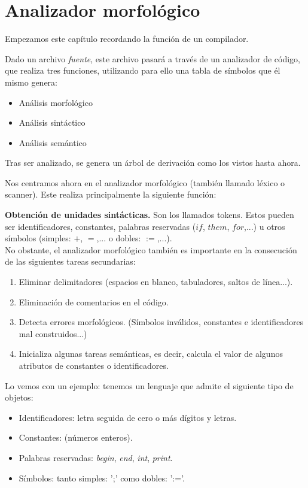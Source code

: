 \documentclass{apuntes}
\begin{document}
\chapter{Analizador morfológico}
Empezamos este capítulo recordando la función de un compilador.

Dado un archivo \textit{fuente}, este archivo pasará a través de un analizador de código, que realiza tres funciones, utilizando para ello una tabla de símbolos que él mismo genera:
\begin{itemize}
\item Análisis morfológico
\item Análisis sintáctico
\item Análisis semántico
\end{itemize}
Tras ser analizado, se genera un árbol de derivación como los vistos hasta ahora.

Nos centramos ahora en el analizador morfológico (también llamado léxico o scanner). Este realiza principalmente la siguiente función:

\textbf{Obtención de unidades sintácticas.} Son los llamados tokens. Estos pueden ser identificadores, constantes, palabras reservadas ($if$, $them$, $for$,...) u otros símbolos (simples: $+$, $=$,... o dobles: $:=$,...).\\

No obstante, el analizador morfológico también es importante en la consecución de las siguientes tareas secundarias:
\begin{enumerate}
\item Eliminar delimitadores (espacios en blanco, tabuladores, saltos de línea...).
\item Eliminación de comentarios en el código.
\item Detecta errores morfológicos. (Símbolos inválidos, constantes e identificadores mal construidos...)
\item Inicializa algunas tareas semánticas, es decir, calcula el valor de algunos atributos de constantes o identificadores.
\end{enumerate}

Lo vemos con un ejemplo: tenemos un lenguaje que admite el siguiente tipo de objetos:
\begin{itemize}
\item Identificadores: letra seguida de cero o más dígitos y letras.
\item Constantes: (números enteros).
\item Palabras reservadas: \textit{begin}, \textit{end}, \textit{int}, \textit{print}.
\item Símbolos: tanto simples: ';' como dobles: ':='.
\end{itemize}
\end{document}
